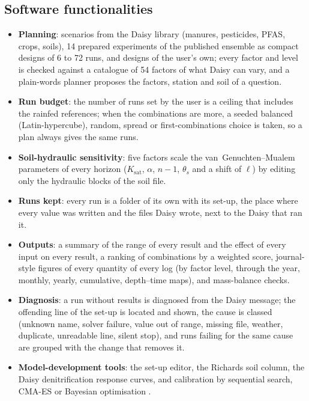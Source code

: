 \documentclass[preprint,12pt]{elsarticle}
\begin{document}

\subsection{Software functionalities}
\begin{itemize}[nosep]
\item \textbf{Planning}: scenarios from the Daisy library (manures, pesticides, PFAS, crops, soils), 14 prepared experiments of the published ensemble as compact designs of 6 to 72 runs, and designs of the user's own; every factor and level is checked against a catalogue of 54 factors of what Daisy can vary, and a plain-words planner proposes the factors, station and soil of a question.
\item \textbf{Run budget}: the number of runs set by the user is a ceiling that includes the rainfed references; when the combinations are more, a seeded balanced (Latin-hypercube), random, spread or first-combinations choice is taken, so a plan always gives the same runs.
\item \textbf{Soil-hydraulic sensitivity}: five factors scale the van~Genuchten--Mualem parameters of every horizon ($K_\mathrm{sat}$, $\alpha$, $n-1$, $\theta_s$ and a shift of $\ell$) by editing only the hydraulic blocks of the soil file.
\item \textbf{Runs kept}: every run is a folder of its own with its set-up, the place where every value was written and the files Daisy wrote, next to the Daisy that ran it.
\item \textbf{Outputs}: a summary of the range of every result and the effect of every input on every result, a ranking of combinations by a weighted score, journal-style figures of every quantity of every log (by factor level, through the year, monthly, yearly, cumulative, depth--time maps), and mass-balance checks.
\item \textbf{Diagnosis}: a run without results is diagnosed from the Daisy message; the offending line of the set-up is located and shown, the cause is classed (unknown name, solver failure, value out of range, missing file, weather, duplicate, unreadable line, silent stop), and runs failing for the same cause are grouped with the change that removes it.
\item \textbf{Model-development tools}: the set-up editor, the Richards soil column, the Daisy denitrification response curves, and calibration by sequential search, CMA-ES \cite{HansenOstermeier2001} or Bayesian optimisation \cite{Mockus1978}.
\end{itemize}
\end{document}
